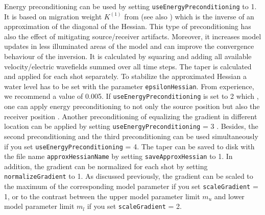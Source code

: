 \documentclass[pdftex,a4paper,parskip,listof=totoc,bibliography=totoc,onehalfspacing,12pt]{scrreprt}
\begin{document}
Energy preconditioning can be used by setting \verb+useEnergyPreconditioning+ to 1. It is based on migration weight $K^{(1)}$ from \cite{plessix2004frequency} (see also \cite{shin2001improved}) which is the inverse of an approximation of the diagonal of the Hessian. This type of preconditioning has also the effect of mitigating source/receiver artifacts. Moreover, it increases model updates in less illuminated areas of the model and can improve the convergence behaviour of the inversion. It is calculated by squaring and adding all available velocity/electric wavefields summed over all time steps. The taper is calculated and applied for each shot separately. To stabilize the approximated Hessian a water level has to be set with the parameter \verb+epsilonHessian+. From experience, we recommend a value of 0.005. If \verb+useEnergyPreconditioning+ is set to 2 which , one can apply energy preconditioning to not only the source position but also the receiver position \citep{kurzmann2013acoustic}. Another preconditioning of equalizing the gradient in different location can be applied by setting \verb+useEnergyPreconditioning+ = 3 \citep{nuber2015enhancement}. Besides, the second preconditioning and the third preconditioning can be used simultaneously if you set \verb+useEnergyPreconditioning+ = 4.
The taper can be saved to disk with the file name \verb+approxHessianName+ by setting \verb+saveApproxHessian+ to 1.
In addition, the gradient can be normalized for each shot by setting \verb+normalizeGradient+ to 1.
As discussed previously, the gradient can be scaled to the maximum of the corresponding model parameter if you set \verb+scaleGradient+ = 1, or to the contrast between the upper model parameter limit $m_u$ and lower model parameter limit $m_l$ if you set \verb+scaleGradient+ = 2.
\end{document}
